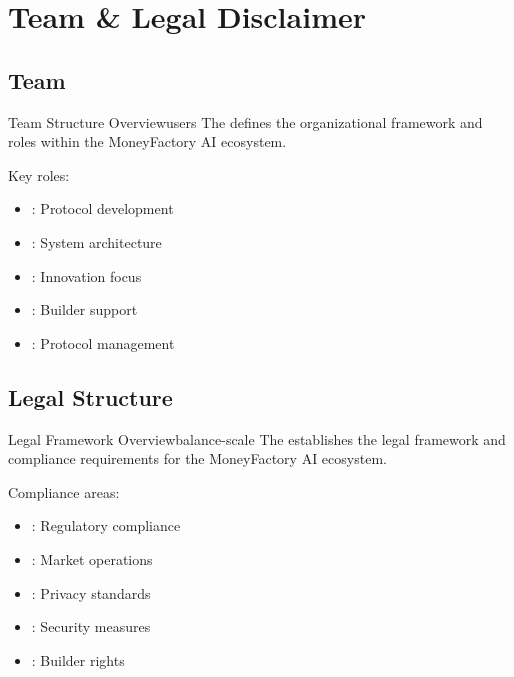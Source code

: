 
\section{Team \& Legal Disclaimer}

\subsection{Team}

\begin{mfai-box}{Team Structure Overview}{users}
The  defines the organizational framework and roles within the MoneyFactory AI ecosystem.
\end{mfai-box}

Key roles:

\begin{itemize}[leftmargin=*]
\item {}: Protocol development
\item {}: System architecture
\item {}: Innovation focus
\item {}: Builder support
\item {}: Protocol management
\end{itemize}

\subsection{Legal Structure}

\begin{mfai-box-learn}{Legal Framework Overview}{balance-scale}
The  establishes the legal framework and compliance requirements for the MoneyFactory AI ecosystem.
\end{mfai-box-learn}

Compliance areas:

\begin{itemize}[leftmargin=*]
\item {}: Regulatory compliance
\item {}: Market operations
\item {}: Privacy standards
\item {}: Security measures
\item {}: Builder rights
\end{itemize}

